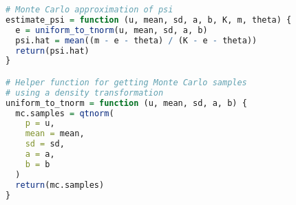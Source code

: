 \begin{lstlisting}[language=R, caption = {Functions implementing MINMI in R.}]
# Monte Carlo approximation of psi
estimate_psi = function (u, mean, sd, a, b, K, m, theta) {
  e = uniform_to_tnorm(u, mean, sd, a, b)
  psi.hat = mean((m - e - theta) / (K - e - theta))
  return(psi.hat)
}

# Helper function for getting Monte Carlo samples
# using a density transformation
uniform_to_tnorm = function (u, mean, sd, a, b) {
  mc.samples = qtnorm(
    p = u,
    mean = mean,
    sd = sd,
    a = a,
    b = b
  )
  return(mc.samples)
}

\end{lstlisting}